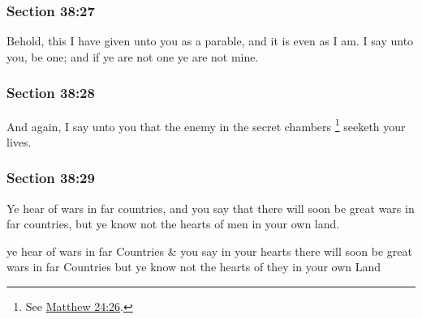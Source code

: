 	\subsubsection{Section 38:27} %
		\label{DC38-27}

		Behold, this I have given unto you as a parable, and it is even as I am. I say unto you, be one; and if ye are not one ye are not mine.


	\subsubsection{Section 38:28} %
		\label{DC38-28}

		And again, I say unto you that the enemy in the secret chambers%
			\footnote{%
				See \hyperref[MATTHEW-24-26]{Matthew 24:26}.
				}
		seeketh your lives.


	\subsubsection{Section 38:29} %
		\label{DC38-29}

		Ye hear of wars in far countries, and you say that there will soon be great wars in far countries, but ye know not the hearts of men in your own land.

		\begin{framed}
		\scriptsize
			\begin{compactdesc}
				\item[JSP] ye hear of wars in far Countries \& you say in your hearts there will soon be great wars in far Countries but ye know not the hearts of they in your own Land
			\end{compactdesc}
		\end{framed}

